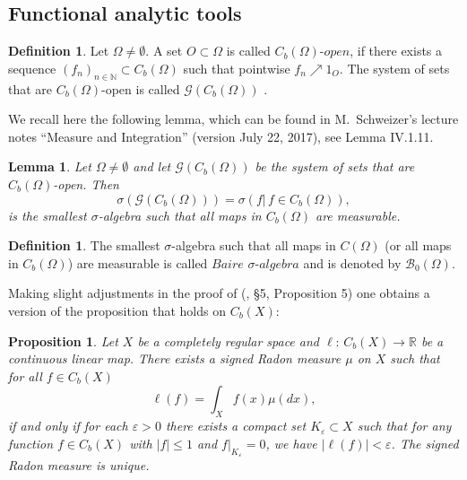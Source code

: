 \documentclass[a4paper,12pt]{article}
\newtheorem{lemma}[theorem]{Lemma}
\newtheorem{proposition}[theorem]{Proposition}
\theoremstyle{definition}
\newtheorem{definition}[theorem]{Definition}
\theoremstyle{remark}
\numberwithin{equation}{section}
\numberwithin{theorem}{section}
\begin{document}
\subsection{Functional analytic tools}

\begin{definition}
\label{def:C_b-open} Let $\Omega\neq\emptyset$. A set $O\subset\Omega$
is called $C_{b}(\Omega)$-$\mathit{open}$, if there exists a sequence
$\left(f_{n}\right)_{n\in\mathbb{N}}\subset C_{b}(\Omega)$ such that
pointwise $f_{n}\nearrow1_{O}$. The system of sets that are $C_{b}(\Omega)$-open is called $\mathcal{G}\left(C_{b}(\Omega)\right)$ .
\end{definition}

We recall here the following lemma, which can be found in  M.~Schweizer's lecture notes ``Measure and Integration'' (version
July 22, 2017), see Lemma IV.1.11.
\begin{lemma}
\label{lem:C_b-open sets generate Baire sigma-algebra} Let $\Omega\neq\emptyset$
and let $\mathcal{G}\left(C_{b}(\Omega)\right)$ be the system of
sets that are $C_{b}(\Omega)$-open. Then
\[
\sigma\left(\mathcal{G}\left(C_{b}(\Omega)\right)\right)=\sigma\left(\left.f\right|\,f\in C_{b}(\Omega)\right),
\]
is the smallest $\sigma$-algebra such that all maps in $C_{b}(\Omega)$
are measurable. 
\end{lemma}

\begin{definition}
\label{def:Baire sigma algebra} The smallest $\sigma$-algebra such
that all maps in $C(\Omega)$ (or all maps in $C_b(\Omega)$) are measurable
is called $\mathit{Baire}$ $\sigma$-$\mathit{algebra}$ and is denoted by
$\mathcal{B}_{0}(\Omega)$.
\end{definition}


Making slight adjustments in the proof of (\cite{BoI}, §5, Proposition
5) one obtains a version of the proposition that holds
on $C_{b}\left(X \right)$:
\begin{proposition}
\label{prop:condition when linear funtional on Cb is measure real case}
Let $X$ be a completely regular space and $\ell:\,C_{b}\left(X\right)\rightarrow\mathbb{R}$
be a continuous linear map. There exists a signed Radon measure $\mu$
on $X$ such that for all $f\in C_{b}\left(X \right)$
\[
\ell(f)=\int_{X}f(x)\mu(dx),
\]
if and only if for each $\varepsilon>0$ there exists a compact set
$K_{\varepsilon}\subset X$ such that for any function $f\in C_{b}\left(X \right)$
with $\left|f\right|\leq1$ and $\left.f\right|_{K_{\varepsilon}}=0$, we have 
$
\left|\ell(f)\right|<\varepsilon
$. The signed Radon measure is unique. 
\end{proposition}
\end{document}

